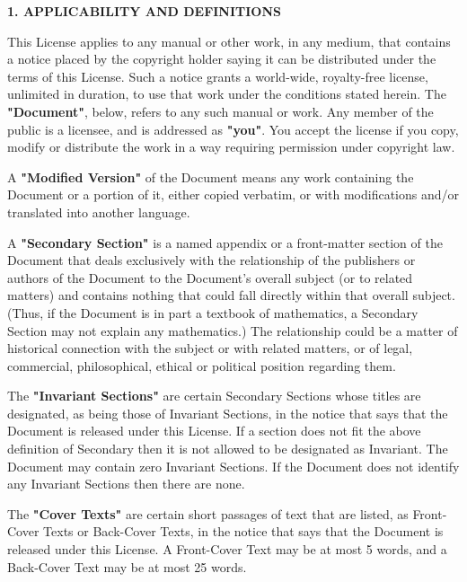 \documentclass{report}
\begin{document}
\begin{center}
{\Large\bf 1. APPLICABILITY AND DEFINITIONS}
\end{center}

This License applies to any manual or other work, in any medium, that
contains a notice placed by the copyright holder saying it can be
distributed under the terms of this License.  Such a notice grants a
world-wide, royalty-free license, unlimited in duration, to use that
work under the conditions stated herein.  The \textbf{"Document"}, below,
refers to any such manual or work.  Any member of the public is a
licensee, and is addressed as \textbf{"you"}.  You accept the license if you
copy, modify or distribute the work in a way requiring permission
under copyright law.

A \textbf{"Modified Version"} of the Document means any work containing the
Document or a portion of it, either copied verbatim, or with
modifications and/or translated into another language.

A \textbf{"Secondary Section"} is a named appendix or a front-matter section of
the Document that deals exclusively with the relationship of the
publishers or authors of the Document to the Document's overall subject
(or to related matters) and contains nothing that could fall directly
within that overall subject.  (Thus, if the Document is in part a
textbook of mathematics, a Secondary Section may not explain any
mathematics.)  The relationship could be a matter of historical
connection with the subject or with related matters, or of legal,
commercial, philosophical, ethical or political position regarding
them.

The \textbf{"Invariant Sections"} are certain Secondary Sections whose titles
are designated, as being those of Invariant Sections, in the notice
that says that the Document is released under this License.  If a
section does not fit the above definition of Secondary then it is not
allowed to be designated as Invariant.  The Document may contain zero
Invariant Sections.  If the Document does not identify any Invariant
Sections then there are none.

The \textbf{"Cover Texts"} are certain short passages of text that are listed,
as Front-Cover Texts or Back-Cover Texts, in the notice that says that
the Document is released under this License.  A Front-Cover Text may
be at most 5 words, and a Back-Cover Text may be at most 25 words.
\end{document}
